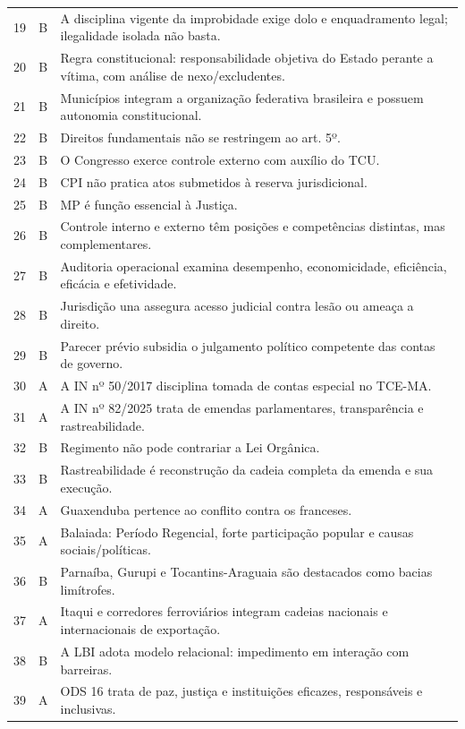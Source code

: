\begin{longtable}{c c p{10.8cm}}
19 & B & A disciplina vigente da improbidade exige dolo e enquadramento legal; ilegalidade isolada não basta. \\
20 & B & Regra constitucional: responsabilidade objetiva do Estado perante a vítima, com análise de nexo/excludentes. \\
21 & B & Municípios integram a organização federativa brasileira e possuem autonomia constitucional. \\
22 & B & Direitos fundamentais não se restringem ao art. 5º. \\
23 & B & O Congresso exerce controle externo com auxílio do TCU. \\
24 & B & CPI não pratica atos submetidos à reserva jurisdicional. \\
25 & B & MP é função essencial à Justiça. \\
26 & B & Controle interno e externo têm posições e competências distintas, mas complementares. \\
27 & B & Auditoria operacional examina desempenho, economicidade, eficiência, eficácia e efetividade. \\
28 & B & Jurisdição una assegura acesso judicial contra lesão ou ameaça a direito. \\
29 & B & Parecer prévio subsidia o julgamento político competente das contas de governo. \\
30 & A & A IN nº 50/2017 disciplina tomada de contas especial no TCE-MA. \\
31 & A & A IN nº 82/2025 trata de emendas parlamentares, transparência e rastreabilidade. \\
32 & B & Regimento não pode contrariar a Lei Orgânica. \\
33 & B & Rastreabilidade é reconstrução da cadeia completa da emenda e sua execução. \\
34 & A & Guaxenduba pertence ao conflito contra os franceses. \\
35 & A & Balaiada: Período Regencial, forte participação popular e causas sociais/políticas. \\
36 & B & Parnaíba, Gurupi e Tocantins-Araguaia são destacados como bacias limítrofes. \\
37 & A & Itaqui e corredores ferroviários integram cadeias nacionais e internacionais de exportação. \\
38 & B & A LBI adota modelo relacional: impedimento em interação com barreiras. \\
39 & A & ODS 16 trata de paz, justiça e instituições eficazes, responsáveis e inclusivas. \\

\end{longtable}
